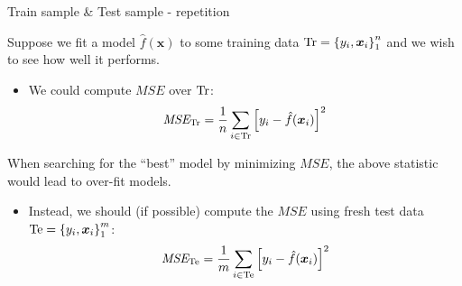 \documentclass{beamer}
\begin{document}
\begin{frame}{Train sample \& Test sample - repetition}

Suppose we fit a model $\hat{f}(\bm{x})$ to some training data $\textnormal{Tr}=\left\lbrace y_i, \bm{x}_i \right\rbrace _1 ^n$ and we wish to see how well it performs.

\begin{itemize}
\item We could compute $\textit{MSE}$ over $\textnormal{Tr}$:
$$ \textit{MSE}_{\textnormal{Tr}} = \frac{1}{n}
   \sum_{i \in \textnormal{Tr}}
   \left[y_i - \hat{f}(\bm{x}_i) \right]^2 $$
\end{itemize}

When searching for the ``best'' model by minimizing $ \textit{MSE}$, the above statistic would lead to over-fit models.
\vspace{0.3cm}
\begin{itemize}
\item Instead, we should (if possible) compute the $ \textit{MSE}$ using fresh test
data $\textnormal{Te}=\left\lbrace y_i, \bm{x}_i \right\rbrace _1 ^m$:
$$ \textit{MSE}_{\textnormal{Te}} = \frac{1}{m}
    \sum_{i \in \textnormal{Te}}
   \left[y_i - \hat{f}(\bm{x}_i) \right]^2 $$
\end{itemize}
\end{frame}
\end{document}

